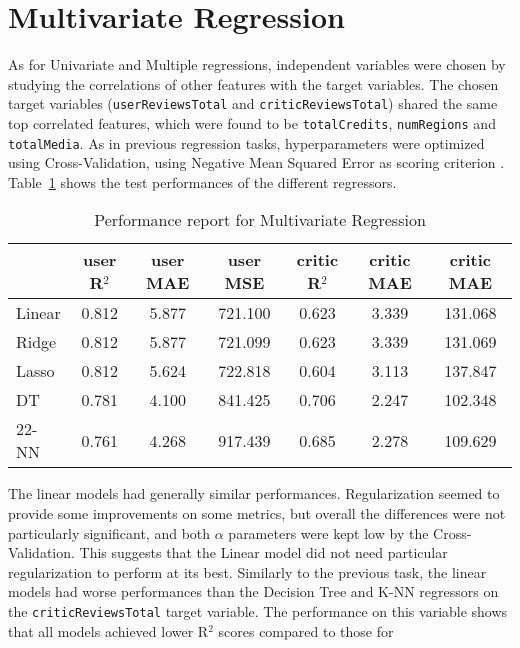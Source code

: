 \section{Multivariate Regression}
As for Univariate and Multiple regressions, independent variables were
chosen by studying the correlations of other features with the target variables.
The chosen target variables (\texttt{userReviewsTotal} and \texttt{criticReviewsTotal})
shared the same top correlated features, which were found to be \texttt{totalCredits},
\texttt{numRegions} and \texttt{totalMedia}.
As in previous regression tasks, hyperparameters were optimized using Cross-Validation,
using Negative Mean Squared Error as scoring criterion .
Table~\ref{tab:multi_regression_report} shows the test performances of the different regressors.
\begin{table}[H]
    \centering
    \begin{tabular}{lccc@{\hskip 30pt}ccc}
        \toprule
         & \textbf{user R$^2$} & \textbf{user MAE} & \textbf{user MSE} & \textbf{critic R$^2$} & \textbf{critic MAE} & \textbf{critic MAE} \\
        \midrule
        Linear & 0.812 & 5.877 & 721.100 & 0.623 & 3.339 & 131.068 \\
        Ridge & 0.812 & 5.877 & 721.099 & 0.623 & 3.339 & 131.069 \\ %
        Lasso & 0.812 & 5.624 & 722.818 & 0.604 & 3.113 & 137.847 \\ %
        DT & 0.781 & 4.100 & 841.425 & 0.706 & 2.247 & 102.348 \\ %
        22-NN & 0.761 & 4.268 & 917.439 & 0.685 & 2.278 & 109.629 \\ %
        \bottomrule
    \end{tabular}
    \caption{Performance report for Multivariate Regression}
    \label{tab:multi_regression_report}
\end{table}
The linear models had generally similar performances. Regularization seemed to provide some improvements
on some metrics, but overall the differences were not particularly significant, and both $\alpha$ parameters
were kept low by the Cross-Validation.
This suggests that the Linear model did not need particular regularization to perform at its best.
Similarly to the previous task, the linear models had worse performances than the Decision Tree and K-NN
regressors on the \texttt{criticReviewsTotal} target variable.
The performance on this variable shows that all models achieved lower R$^2$ scores compared to those for
